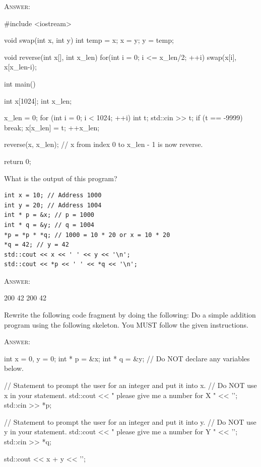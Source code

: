 \textsc{Answer:}
\begin{answercode}
#include <iostream>

void swap(int x, int y)
{
        int temp = x;
        x = y;
        y = temp;
}

void reverse(int x[], int x_len)
{
        for(int i = 0; i <= x_len/2; ++i)
        {
                swap(x[i], x[x_len-i);
        }
}

int main()
{
    int x[1024];
    int x_len;

    x_len = 0;
    for (int i = 0; i < 1024; ++i)
    {
        int t;
        std::cin >> t;
        if (t == -9999)
        {
            break;
        }
        x[x_len] = t;
        ++x_len;
    }

    reverse(x, x_len);
    // x from index 0 to x_len - 1 is now reverse.
    
    return 0;
}
\end{answercode}

\newpage
\nextq
What is the output of this program?
\begin{Verbatim}[frame=single]
int x = 10; // Address 1000
int y = 20; // Address 1004
int * p = &x; // p = 1000 
int * q = &y; // q = 1004
*p = *p * *q; // 1000 = 10 * 20 or x = 10 * 20
*q = 42; // y = 42
std::cout << x << ' ' << y << '\n';
std::cout << *p << ' ' << *q << '\n';
\end{Verbatim}

\textsc{Answer:}
\begin{answercode}
200 42
200 42
\end{answercode}

\newpage
\nextq
Rewrite the following code fragment by doing the following: Do a simple addition
program using the following skeleton.
You MUST follow the given instructions.

\textsc{Answer:}
\begin{answercode}
int x = 0, y = 0;
int * p = &x;
int * q = &y;
// Do NOT declare any variables below.

// Statement to prompt the user for an integer and put it into x.
// Do NOT use x in your statement.
std::cout << " please give me a number for X " << '\n';
std::cin >> *p;


// Statement to prompt the user for an integer and put it into y. 
// Do NOT use y in your statement.
std::cout << " please give me a number for Y " << '\n';
std::cin >> *q;


std::cout << x + y << '\n';
\end{answercode}

